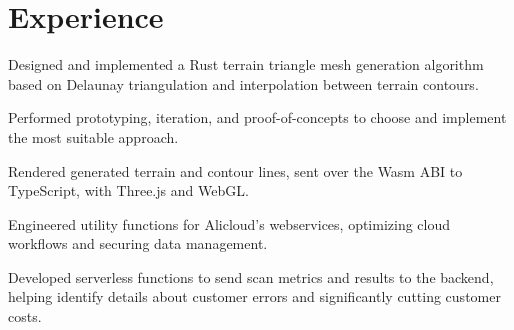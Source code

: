 \section{Experience}

\begin{resumeItem}
\begin{resumeList}
    \item Designed and implemented a Rust terrain triangle mesh generation algorithm based on Delaunay triangulation and interpolation between terrain contours.
    \item Performed prototyping, iteration, and proof-of-concepts to choose and implement the most suitable approach.
    \item Rendered generated terrain and contour lines, sent over the Wasm ABI to TypeScript, with Three.js and WebGL.
\end{resumeList}
\end{resumeItem}

\begin{resumeItem}
\begin{resumeList}
    \item Engineered utility functions for Alicloud's webservices, optimizing cloud workflows and securing data management.
    \item Developed serverless functions to send scan metrics and results to the backend, helping identify details about customer errors and significantly cutting customer costs.
\end{resumeList}
\end{resumeItem}

